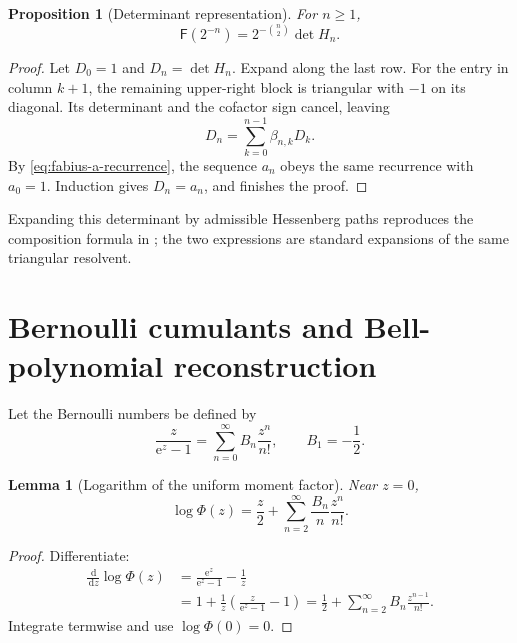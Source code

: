 \documentclass[11pt,oneside,openany]{book}
\newtheorem{lemma}[theorem]{Lemma}
\newtheorem{proposition}[theorem]{Proposition}
\theoremstyle{definition}
\theoremstyle{remark}
\newcommand{\e}{\mathrm e}
\newcommand{\dd}{\,\mathrm d}
\newcommand{\Fab}{\mathsf F}
\begin{document}
\begin{proposition}[Determinant representation]\label{prop:fabius-determinant}
For $n\ge1$,
\begin{equation}\label{eq:fabius-determinant}
 \boxed{\Fab(2^{-n})=2^{-\binom n2}\det H_n.}
\end{equation}
\end{proposition}

\begin{proof}
Let $D_0=1$ and $D_n=\det H_n$.  Expand along the last row.  For the entry in
column $k+1$, the remaining upper-right block is triangular with $-1$ on its
diagonal.  Its determinant and the cofactor sign cancel, leaving
\[
 D_n=\sum_{k=0}^{n-1}\beta_{n,k}D_k.
\]
By \eqref{eq:fabius-a-recurrence}, the sequence $a_n$ obeys the same recurrence
with $a_0=1$.  Induction gives $D_n=a_n$, and
 finishes the proof.
\end{proof}

Expanding this determinant by admissible Hessenberg paths reproduces the
composition formula in ; the two expressions are
standard expansions of the same triangular resolvent.

\section{Bernoulli cumulants and Bell-polynomial reconstruction}

Let the Bernoulli numbers be defined by
\begin{equation}\label{eq:fabius-Bernoulli-def}
 \frac z{\e^z-1}=\sum_{n=0}^{\infty}B_n\frac{z^n}{n!},
 \qquad B_1=-\frac12.
\end{equation}

\begin{lemma}[Logarithm of the uniform moment factor]\label{lem:fabius-log-Phi}
Near $z=0$,
\begin{equation}\label{eq:fabius-log-Phi}
 \log\Phi(z)=\frac z2+
 \sum_{n=2}^{\infty}\frac{B_n}{n}\frac{z^n}{n!}.
\end{equation}
\end{lemma}

\begin{proof}
Differentiate:
\begin{align*}
 \frac{\dd}{\dd z}\log\Phi(z)
 &=\frac{\e^z}{\e^z-1}-\frac1z\\
 &=1+\frac1z\left(\frac z{\e^z-1}-1\right)
 =\frac12+\sum_{n=2}^{\infty}B_n\frac{z^{n-1}}{n!}.
\end{align*}
Integrate termwise and use $\log\Phi(0)=0$.
\end{proof}
\end{document}
